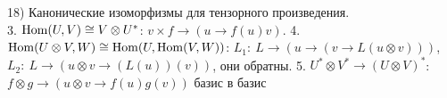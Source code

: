 18) Канонические изоморфизмы для тензорного произведения.\\

3. $\operatorname{Hom} (U,V) \cong V \otimes U^*$: $v\times f \to (u \to f(u)v)$. 4. $ \operatorname{Hom} (U\otimes V,  W) \cong \operatorname{Hom} (U, \operatorname{Hom} (V,W))$: $L_1:\ L \to (u \to (v \to L(u\otimes v)))$, $L_2:\ L \to (u\otimes v \to (L(u))(v))$, они обратны. 5. $U^{*}\otimes V^{*} \to (U \otimes V)^{*}$: $f\otimes g \to (u\otimes v \to f(u)g(v))$ базис в базис
